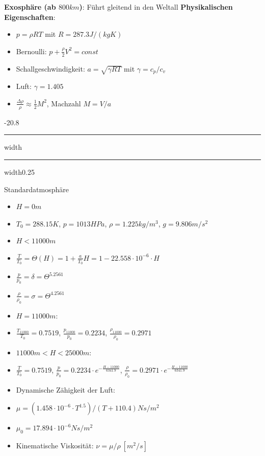 \documentclass[8pt, landscape, fleqn]{scrartcl}
\makeatletter
\renewcommand{\subsection}{\@startsection{subsection}{1}{0mm}%
{-2\baselineskip}{0.8\baselineskip}%
{\hrule depth 0.2pt width\columnwidth\hrule depth0.75pt
width0.25\columnwidth\vspace*{1.2em}\large\bfseries\rmfamily}}
\makeatother
\begin{document}
\begin{multicols*}{3}
\textbf{Exosphäre (ab $800 km$)}: Führt gleitend in den Weltall
\newline \newline
\textbf{Physikalischen Eigenschaften}:
\begin{itemize}
\item $p = \rho R T$ mit $R = 287.3 J/(kg K)$ 
\item Bernoulli: $p + \frac{\rho}{2}V^2 = const$
\item Schallgeschwindigkeit: $a = \sqrt{\gamma R T}$ mit $\gamma = c_p / c_v$
\item Luft: $\gamma = 1.405$
\item $\frac{\Delta \rho}{\rho} \approx \frac{1}{2} M^2$, Machzahl $M = V/a$
\end{itemize}

\subsection{Standardatmosphäre}
\begin{itemize}
    \item $H = 0m$
    \item $T_0 = 288.15 K$, $p = 1013 HPa$, $\rho = 1.225 kg/m^3$, $g = 9.806 m/s^2$
    \item $H < 11000 m$
    \item $\frac{T}{T_0} = \Theta(H)= 1 + \frac{a}{T_0} H = 1-22.558\cdot 10^{-6} \cdot H$
    \item $\frac{p}{p_0} = \delta = \Theta^{5.2561}$
    \item $\frac{\rho}{\rho_0} = \sigma = \Theta^{4.2561}$
    \item $H = 11000 m$:
    \item $\frac{T_{11000}}{T_0} = 0.7519$, $\frac{p_{11000}}{p_0} = 0.2234$, $\frac{\rho_{11000}}{\rho_0} = 0.2971$
    \item $11000 m < H < 25000m$: 
    \item $\frac{T}{T_0}= 0.7519$, $\frac{p}{p_0} = 0.2234 \cdot e^{-\frac{H-11000}{6341.9}}$, $\frac{\rho}{\rho_0} = 0.2971 \cdot e^{-\frac{H-11000}{6341.9}}$
    \item Dynamische Zähigkeit der Luft:
    \item $\mu = (1.458\cdot 10^{-6}\cdot T^{1.5})/(T+110.4) Ns/m^2$
    \item $\mu_0 = 17.894 \cdot 10^{-6} Ns/m^2$
    \item Kinematische Viskosität: $\nu = \mu / \rho~ [m^2/s]$ 
\end{itemize}


\end{multicols*}
\end{document}
